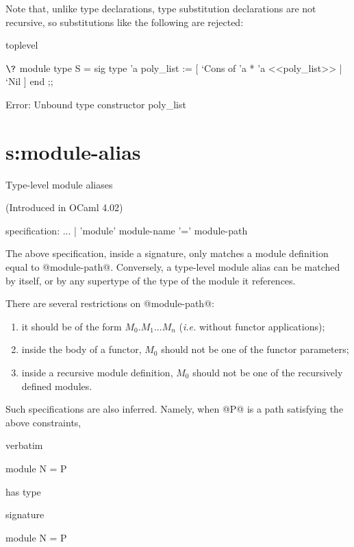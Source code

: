Note that, unlike type declarations, type substitution declarations are not
recursive, so substitutions like the following are rejected:

\begin{camlexample}{toplevel}
\begin{caml}
\begin{camlinput}
$\?$ module type S = sig
    type 'a poly_list := [ `Cons of 'a * 'a <<poly_list>> | `Nil ]
  end ;;
\end{camlinput}
\begin{camlerror}
Error: Unbound type constructor poly_list
\end{camlerror}
\end{caml}
\end{camlexample}

\section{s:module-alias}{Type-level module aliases}

(Introduced in OCaml 4.02)

\begin{syntax}
specification:
          ...
        | 'module' module-name '=' module-path
\end{syntax}

The above specification, inside a signature, only matches a module
definition equal to @module-path@. Conversely, a type-level module
alias can be matched by itself, or by any supertype of the type of the
module it references.

There are several restrictions on @module-path@:
\begin{enumerate}
\item it should be of the form \(M_0.M_1...M_n\) ({\em i.e.} without
  functor applications);
\item inside the body of a  functor, \(M_0\) should not be one of the
  functor parameters;
\item inside a recursive module definition, \(M_0\) should not be one of
  the recursively defined modules.
\end{enumerate}

Such specifications are also inferred. Namely, when @P@ is a path
satisfying the above constraints,
\begin{camlexample}{verbatim}
\begin{caml}
\begin{camlinput}
module N = P
\end{camlinput}
\end{caml}
\end{camlexample}
has type
\begin{camlexample}{signature}
\begin{caml}
\begin{camlinput}
module N = P
\end{camlinput}
\end{caml}
\end{camlexample}

